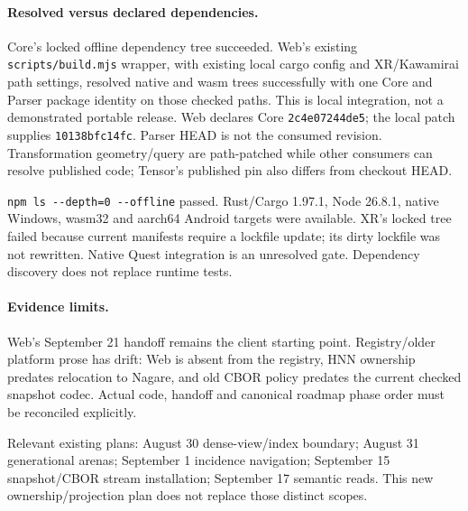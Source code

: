 \documentclass[10pt,a4paper]{article}
\newcommand{\code}[1]{{\small\nolinkurl{#1}}}
\begin{document}
\paragraph{Resolved versus declared dependencies.}
Core's locked offline dependency tree succeeded. Web's existing \code{scripts/build.mjs} wrapper, with existing local cargo config and XR/Kawamirai path settings, resolved native and wasm trees successfully with one Core and Parser package identity on those checked paths. This is local integration, not a demonstrated portable release. Web declares Core \code{2c4e07244de5}; the local patch supplies \code{10138bfc14fc}. Parser HEAD is not the consumed revision. Transformation geometry/query are path-patched while other consumers can resolve published code; Tensor's published pin also differs from checkout HEAD.

\code{npm ls --depth=0 --offline} passed. Rust/Cargo 1.97.1, Node 26.8.1, native Windows, wasm32 and aarch64 Android targets were available. XR's locked tree failed because current manifests require a lockfile update; its dirty lockfile was not rewritten. Native Quest integration is an unresolved gate. Dependency discovery does not replace runtime tests.

\paragraph{Evidence limits.}
Web's September 21 handoff remains the client starting point. Registry/older platform prose has drift: Web is absent from the registry, HNN ownership predates relocation to Nagare, and old CBOR policy predates the current checked snapshot codec. Actual code, handoff and canonical roadmap phase order must be reconciled explicitly.

Relevant existing plans: August 30 dense-view/index boundary; August 31 generational arenas; September 1 incidence navigation; September 15 snapshot/CBOR stream installation; September 17 semantic reads. This new ownership/projection plan does not replace those distinct scopes.
\end{document}
